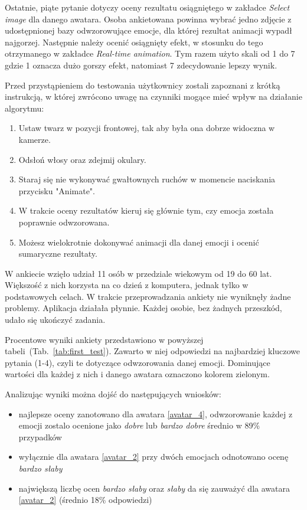 Ostatnie, piąte pytanie dotyczy oceny rezultatu osiągniętego w zakładce \textit{Select image} dla danego awatara. Osoba ankietowana powinna wybrać jedno zdjęcie z udostępnionej bazy odwzorowujące emocje, dla której rezultat animacji wypadł najgorzej. Następnie należy ocenić osiągnięty efekt, w stosunku do tego otrzymanego w zakładce \textit{Real-time animation}. Tym razem użyto skali od 1 do 7 gdzie 1 oznacza dużo gorszy efekt, natomiast 7 zdecydowanie lepszy wynik.

Przed przystąpieniem do testowania użytkownicy zostali zapoznani z krótką instrukcją, w której zwrócono uwagę na czynniki mogące mieć wpływ na działanie algorytmu:

\begin{enumerate}
    \item Ustaw twarz w pozycji frontowej, tak aby była ona dobrze widoczna w kamerze.
    \item Odsłoń włosy oraz zdejmij okulary.
    \item Staraj się nie wykonywać gwałtownych ruchów w momencie naciskania przycisku "Animate".
    \item W trakcie oceny rezultatów kieruj się głównie tym, czy emocja została poprawnie odwzorowana.
    \item Możesz wielokrotnie dokonywać animacji dla danej emocji i ocenić sumaryczne rezultaty.
\end{enumerate}



W ankiecie wzięło udział 11 osób w przedziale wiekowym od 19 do 60 lat. Większość z nich korzysta na co dzień z komputera, jednak tylko w podstawowych celach. W trakcie przeprowadzania ankiety nie wyniknęły żadne problemy. Aplikacja działała płynnie. Każdej osobie, bez żadnych przeszkód, udało się ukończyć zadania.

Procentowe wyniki ankiety przedstawiono w powyższej tabeli~(Tab.~\ref{tab:first_test}). Zawarto w niej odpowiedzi na najbardziej kluczowe pytania (1-4), czyli te dotyczące odwzorowania danej emocji. Dominujące wartości dla każdej z nich i danego awatara oznaczono kolorem zielonym. 

Analizując wyniki można dojść do następujących wniosków:
\begin{itemize}
    \item najlepsze oceny zanotowano dla awatara \ref{avatar_4}, odwzorowanie każdej z emocji zostalo ocenione jako \textit{dobre} lub \textit{bardzo dobre} średnio w 89\% przypadków
    \item wyłącznie dla awatara \ref{avatar_2} przy dwóch emocjach odnotowano ocenę \textit{bardzo słaby}
    \item największą liczbę ocen \textit{bardzo słaby} oraz \textit{słaby} da się zauważyć dla awatara \ref{avatar_2} (średnio 18\% odpowiedzi)
\end{itemize}

